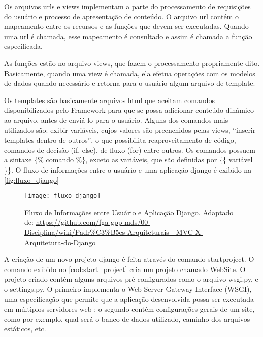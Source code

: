 				Os arquivos urls e views implementam a parte do processamento de requisições do usuário e processo de apresentação de conteúdo. O arquivo url contém o mapeamento entre os recursos e as funções que devem ser executadas. Quando uma url é chamada, esse mapeamento é consultado e assim é chamada a função especificada.
				
				As funções estão no arquivo views, que fazem o processamento propriamente dito. Basicamente, quando uma view é chamada, ela efetua operações com os modelos de dados quando necessário e retorna para o usuário algum arquivo de template.
				
				Os templates são basicamente arquivos html que aceitam comandos disponibilizados pelo Framework para que se possa adicionar conteúdo dinâmico ao arquivo, antes de enviá-lo para o usuário. Alguns dos comandos mais utilizados são: exibir variáveis, cujos valores são preenchidos pelas views, ``inserir templates dentro de outros'', o que possibilita reaproveitamento de código, comandos de decisão (if, else), de fluxo (for) entre outros. Os comandos possuem a sintaxe  \{\% comando \%\}, exceto as variáveis, que são definidas por \{\{ variável \}\}. O fluxo de informações entre o usuário e uma aplicação django é exibido na \autoref{fig:fluxo_django}
				
				\begin{figure}[!htb]	
					\captionsetup{justification=centering}
					\begin{center}
						\texttt{[image: fluxo\_django]}  %
						\caption[Fluxo de Informações entre Usuário e Aplicação Django]{\label{fig:fluxo_django}Fluxo de Informações entre Usuário e Aplicação Django. Adaptado de: \url{https://github.com/fga-gpp-mds/00-Disciplina/wiki/Padr\%C3\%B5es-Arquiteturais---MVC-X-Arquitetura-do-Django}}
					\end{center}		
				\end{figure}
				
				A criação de um novo projeto django é feita através do comando startproject. O comando exibido no \autoref{cod:start_project} cria um projeto chamado WebSite. O projeto criado contém alguns arquivos pré-configurados como o arquivo wsgi.py, e o settings.py. O primeiro implementa o Web Server Gateway Interface (WSGI), uma especificação que permite que a aplicação desenvolvida possa ser executada em múltiplos servidores web \cite{klaus2012}; o segundo contém configurações gerais de um site, como por exemplo, qual será o banco de dados utilizado, caminho dos arquivos estáticos, etc.
								
